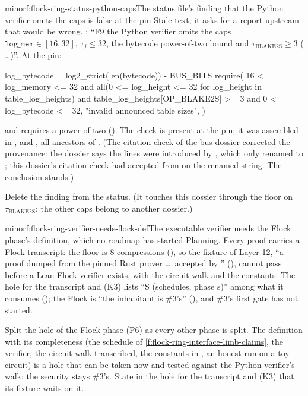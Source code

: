 \begin{finding}{minor}{f:flock-ring-status-python-caps}{The status file's finding that the Python
verifier omits the caps is false at the pin}
 Stale text; it asks for a report upstream that would be wrong.
: \enquote{F9 the Python verifier omits the caps $\mathtt{log\_mem} ∈ [16, 32]$,
$τ_j ≤ 32$, the bytecode power-of-two bound and $τ_{\mathrm{BLAKE2S}} ≥ 3$
( \dots)}. At the pin:
\begin{srccode}
    log_bytecode = log2_strict(len(bytecode)) - BUS_BITS
    require(
        16 <= log_memory <= 32
        and all(0 <= log_height <= 32 for log_height in table_log_heights)
        and table_log_heights[OP_BLAKE2S] >= 3
        and 0 <= log_bytecode <= 32,
        "invalid announced table sizes",
    )
\end{srccode}
and  requires a power of two (). The check is present
at the pin; it was assembled in ,  and , all
ancestors of . (The citation check of the bus dossier corrected the provenance:
the dossier says the lines were introduced by , which only renamed
 to ; this dossier's citation check had accepted
 from  on the renamed string. The conclusion stands.)

 Delete the finding from the status. (It touches this dossier through the
floor on $τ_{\mathrm{BLAKE2S}}$; the other caps belong to another dossier.)
\end{finding}

\begin{finding}{minor}{f:flock-ring-verifier-needs-flock-def}{The executable verifier needs the
Flock phase's definition, which no roadmap has started}
 Planning. Every proof carries a Flock transcript: the floor is 8 compressions
(), so the fixture of Layer 12, \enquote{a proof dumped from the pinned Rust
prover \dots\ accepted by } (), cannot pass before a Lean Flock
verifier exists, with the circuit walk and the constants. The hole for the transcript and
 (K3) lists \enquote{S (schedules, phase s)} among what it consumes
(); the Flock  is \enquote{the inhabitant is \#3's} (), and
\#3's first gate has not started.

 Split the hole of the Flock phase (P6) as every other phase is split. The
definition with its completeness (the schedule of \cref{f:flock-ring-interface-limb-claims}, the
verifier, the circuit walk transcribed, the constants in , an honest run on a toy
circuit) is a hole that can be taken now and tested against the Python verifier's walk; the
security stays \#3's. State in the hole for the transcript and  (K3) that its fixture
waits on it.
\end{finding}


